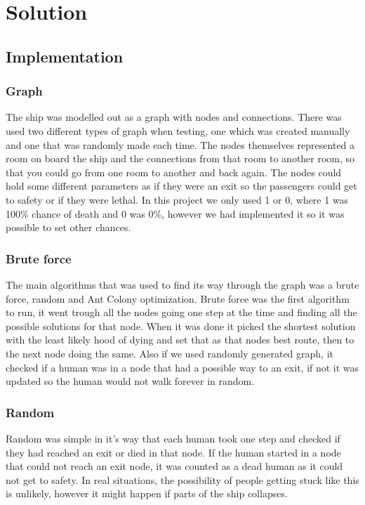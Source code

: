 \chapter{Solution}
\label{ch:solution}


\section{Implementation}

\subsection{Graph}
The ship was modelled out as a graph with nodes and connections. There was used two different types of graph when testing, one which was created manually and one that was randomly made each time. The nodes themselves represented a room on board the ship and the connections from that room to another room, so that you could go from one room to another and back again. The nodes could hold some different parameters as if they were an exit so the passengers could get to safety or if they were lethal. In this project we only used 1 or 0, where 1 was 100\% chance of death and 0 was 0\%, however we had implemented it so it was possible to set other chances.

\subsection{Brute force}
The main algorithms that was used to find its way through the graph was a brute force, random and Ant Colony optimization. Brute force was the first algorithm to run, it went trough all the nodes going one step at the time and finding all the possible solutions for that node. When it was done it picked the shortest solution with the least likely hood of dying and set that as that nodes best route, then to the next node doing the same. Also if we used randomly generated graph, it checked if a human was in a node that had a possible way to an exit, if not it was updated so the human would not walk forever in random. 

\subsection{Random}
Random was simple in it's way that each human took one step and checked if they had reached an exit or died in that node. If the human started in a node that could not reach an exit node, it was counted as a dead human as it could not get to safety. In real situations, the possibility of people getting stuck like this is unlikely, however it might happen if parts of the ship collapses.

